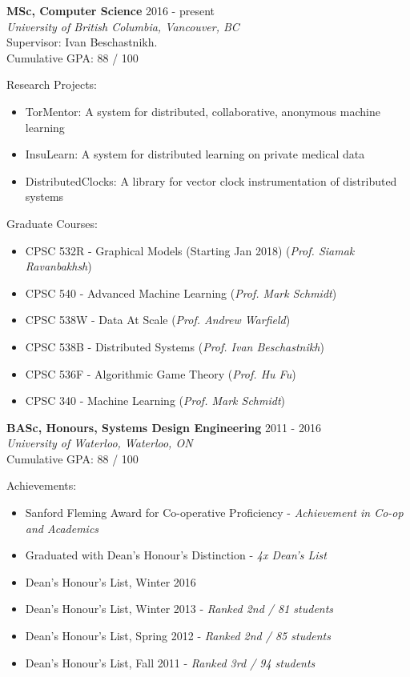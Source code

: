 \documentclass[10pt]{res} %
\begin{document}
\begin{resume}
\vspace{0.2in} %

\textbf {MSc, Computer Science} \hfill 2016 - present \\ 
{\sl University of British Columbia, Vancouver, BC} \\
Supervisor: Ivan Beschastnikh. \\
Cumulative GPA: 88 / 100

Research Projects:
\begin{itemize}   
    \item TorMentor: A system for distributed, collaborative, anonymous
    machine learning
    \item InsuLearn: A system for distributed learning on private
    medical data
    \item DistributedClocks: A library for vector clock instrumentation
    of distributed systems
\end{itemize}

Graduate Courses:
\begin{itemize} 
    \item CPSC 532R - Graphical Models (Starting Jan 2018) (\emph{Prof.
    Siamak Ravanbakhsh})
    \item CPSC 540 - Advanced Machine Learning (\emph{Prof. Mark
    Schmidt})
    \item CPSC 538W - Data At Scale (\emph{Prof. Andrew Warfield})
    \item CPSC 538B - Distributed Systems (\emph{Prof. Ivan
    Beschastnikh})
    \item CPSC 536F - Algorithmic Game Theory (\emph{Prof. Hu Fu})
    \item CPSC 340 - Machine Learning (\emph{Prof. Mark Schmidt})
\end{itemize}

\textbf {BASc, Honours, Systems Design Engineering} \hfill 2011 - 2016 \\ 
{\sl University of Waterloo, Waterloo, ON} \\
Cumulative GPA: 88 / 100

Achievements:
\begin{itemize} 
    \item Sanford Fleming Award for Co-operative Proficiency - {\sl
    Achievement in Co-op and Academics}
    \item Graduated with Dean's Honour's Distinction - {\sl 4x Dean's
    List}
    \item Dean's Honour's List, Winter 2016
    \item Dean's Honour's List, Winter 2013 - {\sl Ranked 2nd / 81
    students}
    \item Dean's Honour's List, Spring 2012 - {\sl Ranked 2nd / 85 students}
    \item Dean's Honour's List, Fall 2011 - {\sl Ranked 3rd / 94 students}
\end{itemize}


\end{resume}
\end{document}
